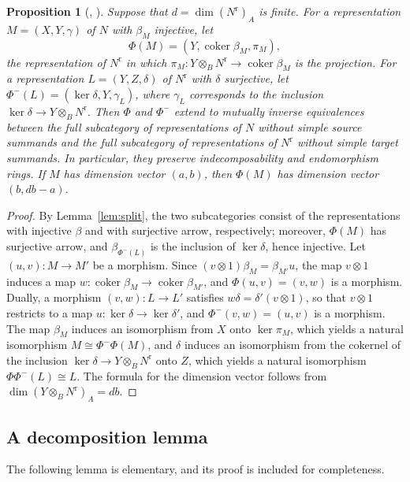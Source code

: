 \documentclass[11pt,a4paper]{amsart}
\newtheorem{proposition}[theorem]{Proposition}
\numberwithin{equation}{section}
\newcommand{\coker}{\operatorname{coker}}
\newcommand{\rr}{\mathrm{r}}
\begin{document}
\begin{proposition}[{\cite{DR}, \cite{Si81}}]\label{prop:reflect}
Suppose that $d=\dim(N^{\rr})_A$ is finite. For a representation $M=(X,Y,\gamma)$ of $N$ with $\beta_M$ injective, let
\[
\Phi(M)=(Y,\coker\beta_M,\pi_M),
\]
the representation of $N^{\rr}$ in which $\pi_M\colon Y\otimes_BN^{\rr}\to\coker\beta_M$ is the projection. For a representation $L=(Y,Z,\delta)$ of $N^{\rr}$ with $\delta$ surjective, let $\Phi^-(L)=(\ker\delta,Y,\gamma_L)$, where $\gamma_L$ corresponds to the inclusion $\ker\delta\to Y\otimes_BN^{\rr}$. Then $\Phi$ and $\Phi^-$ extend to mutually inverse equivalences between the full subcategory of representations of $N$ without simple source summands and the full subcategory of representations of $N^{\rr}$ without simple target summands. In particular, they preserve indecomposability and endomorphism rings. If $M$ has dimension vector $(a,b)$, then $\Phi(M)$ has dimension vector $(b,db-a)$.
\end{proposition}

\begin{proof}
By Lemma~\ref{lem:split}, the two subcategories consist of the representations with injective $\beta$ and with surjective arrow, respectively; moreover, $\Phi(M)$ has surjective arrow, and $\beta_{\Phi^-(L)}$ is the inclusion of $\ker\delta$, hence injective. Let $(u,v)\colon M\to M'$ be a morphism. Since $(v\otimes1)\beta_M=\beta_{M'}u$, the map $v\otimes1$ induces a map $w\colon\coker\beta_M\to\coker\beta_{M'}$, and $\Phi(u,v)=(v,w)$ is a morphism. Dually, a morphism $(v,w)\colon L\to L'$ satisfies $w\delta=\delta'(v\otimes1)$, so that $v\otimes1$ restricts to a map $u\colon\ker\delta\to\ker\delta'$, and $\Phi^-(v,w)=(u,v)$ is a morphism. The map $\beta_M$ induces an isomorphism from $X$ onto $\ker\pi_M$, which yields a natural isomorphism $M\cong\Phi^-\Phi(M)$, and $\delta$ induces an isomorphism from the cokernel of the inclusion $\ker\delta\to Y\otimes_BN^{\rr}$ onto $Z$, which yields a natural isomorphism $\Phi\Phi^-(L)\cong L$. The formula for the dimension vector follows from $\dim(Y\otimes_BN^{\rr})_A=db$.
\end{proof}

\subsection{A decomposition lemma}

The following lemma is elementary, and its proof is included for completeness.
\end{document}
